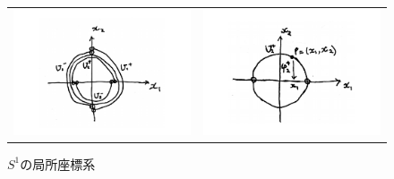 \documentclass[a4j,12pt]{jarticle}
\theoremstyle{definition}
\begin{document}
\begin{figure}[H]
    \begin{tabular}{cc}
      \begin{minipage}[t]{0.45\hsize}
        \centering
        \includegraphics[keepaspectratio, scale=0.2]{localCoSysOfS1_1.pdf}
        \caption{$S^1$の開集合}
        \label{}
      \end{minipage} &
      \begin{minipage}[t]{0.45\hsize}
        \centering
        \includegraphics[keepaspectratio, scale=0.2]{localCoSysOfS1_2.pdf}
        \caption{$S^1$の局所座標系}
        \label{}
      \end{minipage}
    \end{tabular}
  \end{figure}
\end{document}

